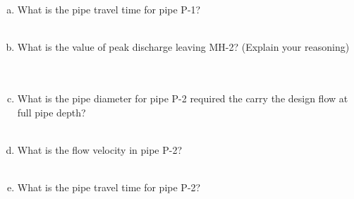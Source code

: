 \documentclass[12pt]{article}
\begin{document}
\begin{enumerate}
\begin{enumerate}[a)]
\item What is the pipe travel time for pipe P-1?  ~\\~\\
\item What is the value of peak discharge leaving MH-2? (Explain your reasoning)  ~\\~\\
\item What is the pipe diameter for pipe P-2 required the carry the design flow at full pipe depth?  ~\\~\\
\item What is the flow velocity in pipe P-2?  ~\\~\\
\item What is the pipe travel time for  pipe P-2?  ~\\~\\
\end{enumerate}
\clearpage


\end{enumerate}
\end{document}
